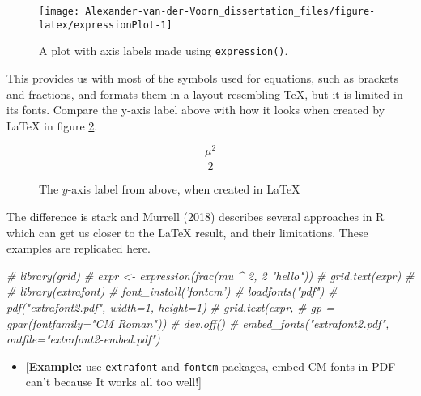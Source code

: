 \documentclass[]{article}
\newenvironment{Shaded}{\begin{snugshade}}{\end{snugshade}}
\newcommand{\CommentTok}[1]{\textcolor[rgb]{0.56,0.35,0.01}{\textit{#1}}}
\providecommand{\tightlist}{%
  \setlength{\itemsep}{0pt}\setlength{\parskip}{0pt}}
\begin{document}
\begin{figure}

{\centering \texttt{[image: Alexander-van-der-Voorn\_dissertation\_files/figure-latex/expressionPlot-1]} 

}

\caption{A plot with axis labels made using \texttt{expression()}.}\label{fig:expressionPlot}
\end{figure}

This provides us with most of the symbols used for equations, such as
brackets and fractions, and formats them in a layout resembling \TeX{},
but it is limited in its fonts. Compare the y-axis label above with how
it looks when created by \LaTeX{} in figure \ref{muOver2}.

\begin{figure}\label{muOver2}
\begin{equation*}
\dfrac{\mu^2}{2}
\end{equation*}
\caption{The \(y\)-axis label from above, when created in \LaTeX}
\end{figure}

The difference is stark and Murrell (2018) describes several approaches
in R which can get us closer to the \LaTeX{} result, and their
limitations. These examples are replicated here.

\begin{Shaded}
\begin{Highlighting}[]
\CommentTok{# library(grid)}
\CommentTok{# expr <- expression(frac(mu ^ 2, 2 "hello"))}
\CommentTok{# grid.text(expr)}
\CommentTok{# }
\CommentTok{# library(extrafont)}
\CommentTok{# font_install('fontcm')}
\CommentTok{# loadfonts("pdf")}
\CommentTok{# pdf("extrafont2.pdf", width=1, height=1)}
\CommentTok{# grid.text(expr,}
\CommentTok{#           gp = gpar(fontfamily="CM Roman"))}
\CommentTok{# dev.off()}
\CommentTok{# embed_fonts("extrafont2.pdf", outfile="extrafont2-embed.pdf")}
\end{Highlighting}
\end{Shaded}

\begin{itemize}
\tightlist
\item
  {[}\textbf{Example:} use \texttt{extrafont} and \texttt{fontcm}
  packages, embed CM fonts in PDF - can't because It works all too
  well!{]}
\end{itemize}
\end{document}

